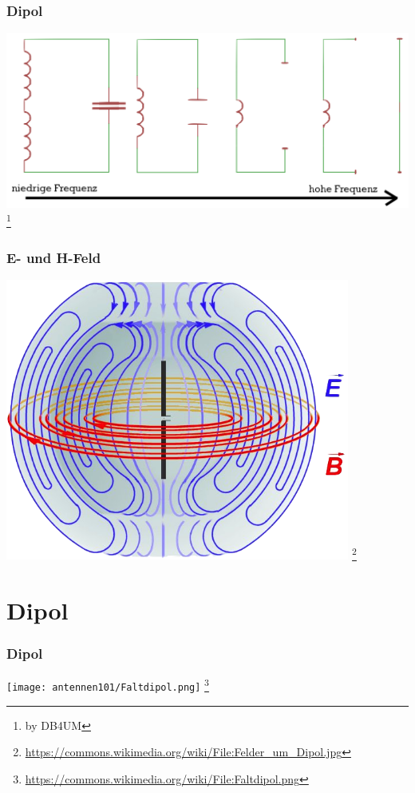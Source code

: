\begin{frame}
    \frametitle{Dipol}
    \begin{center}
        \includegraphics[width=1\textwidth]{e11/dipol_entstehung.png}
        \footnote{\tiny by DB4UM}
	\end{center}
\end{frame}

\begin{frame}
    \frametitle{E- und H-Feld}
    \begin{center}
        \includegraphics[width=0.85\textwidth]{e11/Felder_um_Dipol.png}
        \footnote{\tiny \url{https://commons.wikimedia.org/wiki/File:Felder_um_Dipol.jpg}}
	\end{center}
\end{frame}


\section*{Dipol}

\begin{frame}
    \frametitle{Dipol}
    \begin{center}
        \texttt{[image: antennen101/Faltdipol.png]}
        \footnote{\tiny \url{https://commons.wikimedia.org/wiki/File:Faltdipol.png}}
	\end{center}
\end{frame}


